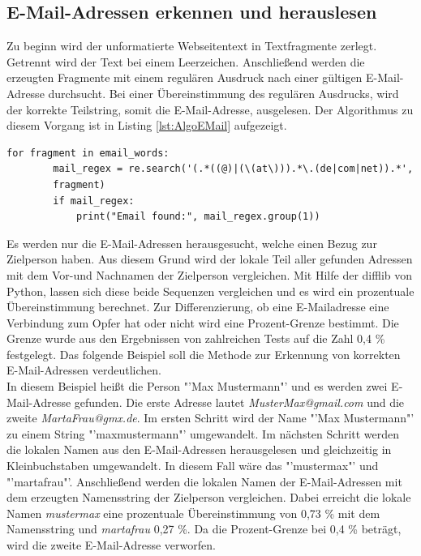 	\subsection{E-Mail-Adressen erkennen und herauslesen}
	Zu beginn wird der unformatierte Webseitentext in Textfragmente zerlegt. Getrennt wird der Text bei einem Leerzeichen. Anschließend werden die erzeugten Fragmente mit einem regulären Ausdruck nach einer gültigen E-Mail-Adresse durchsucht. Bei einer Übereinstimmung des regulären Ausdrucks, wird der korrekte Teilstring, somit die E-Mail-Adresse, ausgelesen. Der Algorithmus zu diesem Vorgang ist in Listing \ref{lst:AlgoEMail} aufgezeigt.\\
	
	\begin{lstlisting}[caption=E-Mail-Adressen herrauslesen,label={lst:AlgoEMail}]
	for fragment in email_words:
		mail_regex = re.search('(.*((@)|(\(at\))).*\.(de|com|net)).*',
		fragment)
		if mail_regex:
			print("Email found:", mail_regex.group(1))
	\end{lstlisting}   

	Es werden nur die E-Mail-Adressen herausgesucht, welche einen Bezug zur Zielperson haben. Aus diesem Grund wird der lokale Teil aller gefunden Adressen mit dem Vor-und Nachnamen der Zielperson vergleichen. Mit Hilfe der difflib von Python, lassen sich diese beide Sequenzen vergleichen und es wird ein prozentuale Übereinstimmung berechnet. Zur Differenzierung, ob eine E-Mailadresse eine Verbindung zum Opfer hat oder nicht wird eine Prozent-Grenze bestimmt. Die Grenze wurde aus den Ergebnissen von zahlreichen Tests auf die Zahl 0,4 \% festgelegt. Das folgende Beispiel soll die Methode zur Erkennung von korrekten E-Mail-Adressen verdeutlichen.\\
	In diesem Beispiel heißt die Person "'Max Mustermann"' und es werden zwei E-Mail-Adresse gefunden. Die erste Adresse lautet \textit{MusterMax@gmail.com} und die zweite \textit{MartaFrau@gmx.de}. Im ersten Schritt wird der Name "'Max Mustermann"' zu einem String "'maxmustermann"' umgewandelt. Im nächsten Schritt werden die lokalen Namen aus den E-Mail-Adressen herausgelesen und gleichzeitig in Kleinbuchstaben umgewandelt. In diesem Fall wäre das "'mustermax"' und "'martafrau"'. Anschließend werden die lokalen Namen der E-Mail-Adressen mit dem erzeugten Namensstring der Zielperson vergleichen. Dabei erreicht die lokale Namen \textit{mustermax} eine prozentuale Übereinstimmung von 0,73 \% mit dem Namensstring und \textit{martafrau} 0,27 \%. Da die Prozent-Grenze bei 0,4 \% beträgt, wird die zweite E-Mail-Adresse verworfen.
		
